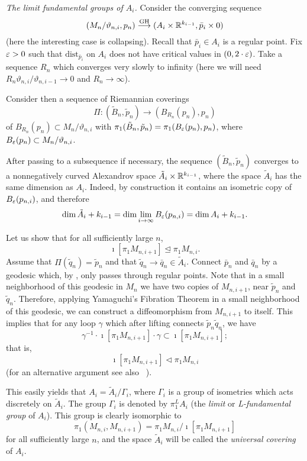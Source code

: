 \documentclass{amsart}
\begin{document}
{\it The limit fundamental groups of $A_i$.} 
Consider the converging sequence
\[(M_{n}/\vartheta_{n,i},p_{n})\GHto (A_i\times {\Bbb R}^{k_{i-1}},\bar p_i\times 0)\]
(here the interesting case is collapsing).
Recall that
$\bar p_i\in A_i$
is a regular point.
Fix $\varepsilon>0$ such that
$\text{dist}_{\bar p_i}$ on $A_i$
does not have critical values in $(0,2\cdot \varepsilon)$.
Take a sequence $R_n$ which converges very slowly to infinity
(here
we will need $R_n\vartheta_{n,i}/\vartheta_{n,i-1}\to 0$ and $R_n\to \infty$).

Consider then
a sequence of Riemannian coverings
$$\Pi\colon (\tilde B_n,\tilde p_n)\to (B_{R_n}(p_n), p_n)$$
of
$B_{R_n}(p_n)\subset {M}_n/\vartheta_{n,i}$ with
$\pi_1(\tilde B_n,\tilde p_n)=\pi_1(B_\varepsilon(p_{n}), p_n)$,
where $B_\varepsilon(p_{n})\subset M_n/\vartheta_{n,i}$.

After passing to a subsequence if necessary,
the sequence $(\tilde B_n,\tilde p_n)$
converges to a nonnegatively curved Alexandrov space
$\tilde A_i\times {\Bbb R}^{k_{i-1}}$,
where the space $\tilde A_i$ has the same dimension as $A_i$.
Indeed, by construction it  contains an isometric copy of
$B_\varepsilon(p_{n,i})$, and therefore
$$\dim \tilde A_i +k_{i-1}=
\dim \lim_{i\to\infty} B_\varepsilon(p_{n,i})=\dim A_i+k_{i-1}.$$

Let us show that for all sufficiently large $n$,
$$\imath[\pi_1M_{n,i+1}]\trianglelefteq\pi_1M_{n,i}.$$
Assume that $\Pi(\tilde q_n)=\tilde p_n$
and that $\tilde q_n\to \bar q_n\in \tilde A_i$.
Connect $\bar p_n$ and $\bar q_n$ by a geodesic
which, by \cite{Ptr3}, only passes  through regular points.
Note that in a small neighborhood  of this geodesic in $M_n$
 we have two copies of $M_{n,i+1}$, near $\tilde p_n$ and $\tilde q_n$.
Therefore,
applying Yamaguchi's  Fibration Theorem
in a small neighborhood  of this geodesic,
we can construct a diffeomorphism from $M_{n,i+1}$ to itself.
This  implies that for any loop $\gamma$ which after lifting
connects $\tilde p_n \tilde q_n$,
we have 
$$\gamma^{-1}\cdot \imath[\pi_1M_{n,i+1}]\cdot
\gamma\subset \imath[\pi_1M_{n,i+1}];$$  
that is,
$$\imath[\pi_1M_{n,i+1}]\lhd\pi_1M_{n,i}$$
(for an alternative argument see also ~\cite{FY}).


This easily yields that $A_i=\tilde A_i/\Gamma_i$,
where $\Gamma_i$ is a group of isometries
which acts %
discretely on $\tilde A_i$.
The group $\Gamma_i$ is denoted  by $\pi_1^LA_i$
(the \emph{limit} or \emph{L-fundamental group} of $A_i$).
This group  is clearly isomorphic to
$$\pi_1(M_{n,i},M_{n,i+1})=\pi_1M_{n,i}/\imath[ \pi_1M_{n,i+1}]$$
for all sufficiently large $n$, and
the space $\tilde A_i$ will be called the \emph{universal covering} of $A_i$.
\end{document}
